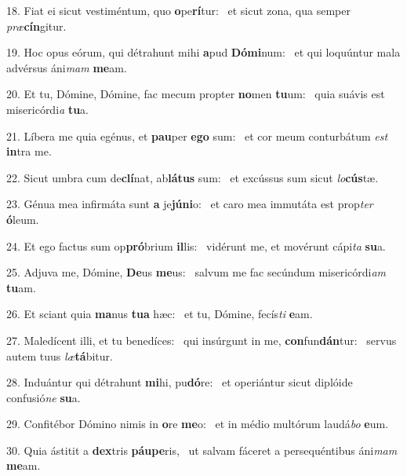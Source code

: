 18. Fiat ei sicut vestiméntum, quo \textbf{o}pe\textbf{rí}tur: \ast\  et sicut zona, qua semper \textit{præ}\textbf{cín}gitur.\

19. Hoc opus eórum, qui détrahunt mihi \textbf{a}pud \textbf{Dó}\textbf{mi}num: \ast\  et qui loquúntur mala advérsus áni\textit{mam} \textbf{me}am.\

20. Et tu, Dómine, Dómine, fac mecum propter \textbf{no}men \textbf{tu}um: \ast\  quia suávis est misericórdi\textit{a} \textbf{tu}a.\

21. Líbera me quia egénus, et \textbf{pau}per \textbf{e}\textbf{go} sum: \ast\  et cor meum conturbátum \textit{est} \textbf{in}tra me.\

22. Sicut umbra cum de\textbf{clí}nat, ab\textbf{lá}\textbf{tus} sum: \ast\  et excússus sum sicut \textit{lo}\textbf{cús}tæ.\

23. Génua mea infirmáta sunt \textbf{a} je\textbf{jú}\textbf{ni}o: \ast\  et caro mea immutáta est prop\textit{ter} \textbf{ó}leum.\

24. Et ego factus sum op\textbf{pró}brium \textbf{il}lis: \ast\  vidérunt me, et movérunt cápi\textit{ta} \textbf{su}a.\

25. Adjuva me, Dómine, \textbf{De}us \textbf{me}us: \ast\  salvum me fac secúndum misericórdi\textit{am} \textbf{tu}am.\

26. Et sciant quia \textbf{ma}nus \textbf{tu}\textbf{a} hæc: \ast\  et tu, Dómine, fecís\textit{ti} \textbf{e}am.\

27. Maledícent illi, et tu benedíces: \dag\  qui insúrgunt in me, \textbf{con}fun\textbf{dán}tur: \ast\  servus autem tuus \textit{læ}\textbf{tá}bitur.\

28. Induántur qui détrahunt \textbf{mi}hi, pu\textbf{dó}re: \ast\  et operiántur sicut diplóide confusió\textit{ne} \textbf{su}a.\

29. Confitébor Dómino nimis in \textbf{o}re \textbf{me}o: \ast\  et in médio multórum laudá\textit{bo} \textbf{e}um.\

30. Quia ástitit a \textbf{dex}tris \textbf{páu}\textbf{pe}ris, \ast\  ut salvam fáceret a persequéntibus áni\textit{mam} \textbf{me}am.\

